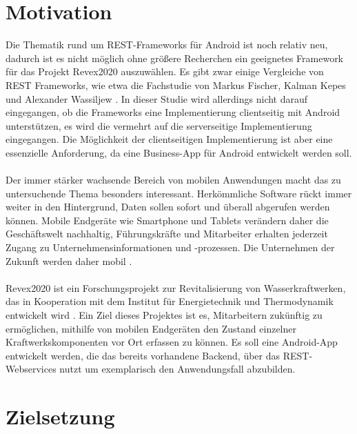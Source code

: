 \section{Motivation}

Die Thematik rund um REST-Frameworks für Android ist noch relativ neu, dadurch ist es nicht möglich ohne größere Recherchen ein geeignetes Framework für das Projekt Revex2020 auszuwählen. Es gibt zwar einige Vergleiche von REST Frameworks, wie etwa die Fachstudie von Markus Fischer, Kalman Kepes und Alexander Wassiljew \cite{vergleich13}. In dieser Studie wird allerdings nicht darauf eingegangen, ob die Frameworks eine Implementierung clientseitig mit Android unterstützen, es wird die vermehrt auf die serverseitige Implementierung eingegangen. Die Möglichkeit der clientseitigen Implementierung ist aber eine essenzielle Anforderung, da eine Business-App für Android entwickelt werden soll. 
\\\\
Der immer stärker wachsende Bereich von mobilen Anwendungen macht das zu untersuchende Thema besonders interessant. Herkömmliche Software rückt immer weiter in den Hintergrund, Daten sollen sofort und überall abgerufen werden können. Mobile Endgeräte wie Smartphone und Tablets verändern daher die Geschäftswelt nachhaltig, Führungskräfte und Mitarbeiter erhalten jederzeit Zugang zu Unternehmensinformationen und -prozessen. Die Unternehmen der Zukunft werden daher mobil \cite{smartMobileApps7}.  
\\\\
Revex2020 ist ein Forschungsprojekt zur Revitalisierung von Wasserkraftwerken, das in Kooperation mit dem Institut für Energietechnik und Thermodynamik entwickelt wird \cite{doujak}. Ein Ziel dieses Projektes ist es, Mitarbeitern zukünftig zu ermöglichen, mithilfe von mobilen Endgeräten den Zustand einzelner Kraftwerkskomponenten vor Ort erfassen zu können. Es soll eine Android-App entwickelt werden, die das bereits vorhandene Backend, über das REST-Webservices nutzt um exemplarisch den Anwendungsfall abzubilden.

\section{Zielsetzung}

